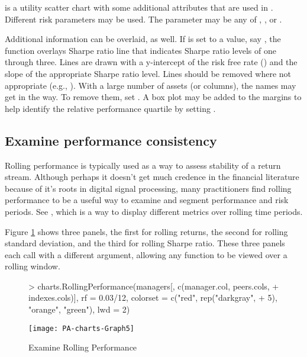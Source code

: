 \documentclass[12pt,letterpaper,english]{article}
\begin{document}
 is a utility scatter chart with
some additional attributes that are used in .
Different risk parameters may be used. The parameter 
may be any of , ,
or .

Additional information can be overlaid, as well. If 
is set to a value, say , the function overlays Sharpe
ratio line that indicates Sharpe ratio levels of one through three.
Lines are drawn with a y-intercept of the risk free rate ()
and the slope of the appropriate Sharpe ratio level. Lines should
be removed where not appropriate (e.g., ).
With a large number of assets (or columns), the names may get in the
way. To remove them, set . A box plot may
be added to the margins to help identify the relative performance
quartile by setting .


\subsection{Examine performance consistency}

Rolling performance is typically used as a way to assess stability
of a return stream. Although perhaps it doesn't get much credence
in the financial literature because of it's roots in digital signal
processing, many practitioners find rolling performance to be a useful
way to examine and segment performance and risk periods. See ,
which is a way to display different metrics over rolling time periods.

Figure \ref{fig:Examine-Rolling-Performance} shows three panels,
the first for rolling returns, the second for rolling standard deviation,
and the third for rolling Sharpe ratio. These three panels each call
 with a different 
argument, allowing any function to be viewed over a rolling window.

%
\begin{figure}

\caption{Examine Rolling Performance}

\label{fig:Examine-Rolling-Performance}

\begin{center}

\begin{Schunk}
\begin{Sinput}
> charts.RollingPerformance(managers[, c(manager.col, peers.cols, 
+     indexes.cols)], rf = 0.03/12, colorset = c("red", rep("darkgray", 
+     5), "orange", "green"), lwd = 2)
\end{Sinput}
\end{Schunk}
\texttt{[image: PA-charts-Graph5]}

\end{center}
\end{figure}
\end{document}
